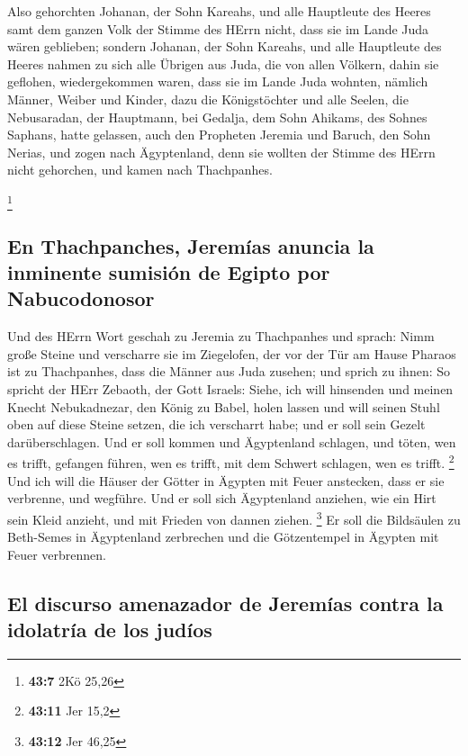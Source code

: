  Also gehorchten Johanan, der Sohn Kareahs, und alle
Hauptleute des Heeres samt dem ganzen Volk der Stimme des HErrn nicht,
dass sie im Lande Juda wären geblieben;  sondern Johanan,
der Sohn Kareahs, und alle Hauptleute des Heeres nahmen zu sich alle
Übrigen aus Juda, die von allen Völkern, dahin sie geflohen,
wiedergekommen waren, dass sie im Lande Juda wohnten, 
nämlich Männer, Weiber und Kinder, dazu die Königstöchter und alle
Seelen, die Nebusaradan, der Hauptmann, bei Gedalja, dem Sohn Ahikams,
des Sohnes Saphans, hatte gelassen, auch den Propheten Jeremia und
Baruch, den Sohn Nerias,  und zogen nach Ägyptenland, denn
sie wollten der Stimme des HErrn nicht gehorchen, und kamen nach
Thachpanhes.

\footnote{\textbf{43:7} 2Kö 25,26}

\hypertarget{en-thachpanches-jeremuxedas-anuncia-la-inminente-sumisiuxf3n-de-egipto-por-nabucodonosor}{%
\subsection{En Thachpanches, Jeremías anuncia la inminente sumisión de
Egipto por
Nabucodonosor}\label{en-thachpanches-jeremuxedas-anuncia-la-inminente-sumisiuxf3n-de-egipto-por-nabucodonosor}}

 Und des HErrn Wort geschah zu Jeremia zu Thachpanhes und
sprach:  Nimm große Steine und verscharre sie im
Ziegelofen, der vor der Tür am Hause Pharaos ist zu Thachpanhes, dass
die Männer aus Juda zusehen;  und sprich zu ihnen: So
spricht der HErr Zebaoth, der Gott Israels: Siehe, ich will hinsenden
und meinen Knecht Nebukadnezar, den König zu Babel, holen lassen und
will seinen Stuhl oben auf diese Steine setzen, die ich verscharrt habe;
und er soll sein Gezelt darüberschlagen.  Und er soll
kommen und Ägyptenland schlagen, und töten, wen es trifft, gefangen
führen, wen es trifft, mit dem Schwert schlagen, wen es trifft.
\footnote{\textbf{43:11} Jer 15,2}  Und ich will die
Häuser der Götter in Ägypten mit Feuer anstecken, dass er sie verbrenne,
und wegführe. Und er soll sich Ägyptenland anziehen, wie ein Hirt sein
Kleid anzieht, und mit Frieden von dannen ziehen. \footnote{\textbf{43:12}
  Jer 46,25}  Er soll die Bildsäulen zu Beth-Semes in
Ägyptenland zerbrechen und die Götzentempel in Ägypten mit Feuer
verbrennen.

\hypertarget{el-discurso-amenazador-de-jeremuxedas-contra-la-idolatruxeda-de-los-juduxedos}{%
\subsection{El discurso amenazador de Jeremías contra la idolatría de
los
judíos}\label{el-discurso-amenazador-de-jeremuxedas-contra-la-idolatruxeda-de-los-juduxedos}}


